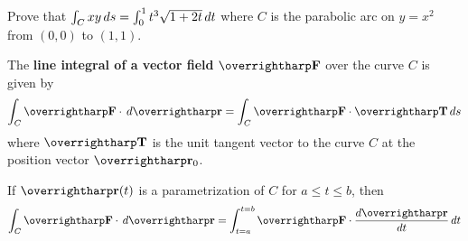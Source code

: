\documentclass[letterpaper, twoside, 12pt]{book}
\begin{document}
          \begin{solution}

          \end{solution}

          \begin{contributors}

          \end{contributors}

          \begin{problem}
            Prove that $\int_C xy\,d{s}=\int_0^1 t^3\sqrt{1+2t}\,d{t}$
            where $C$ is the parabolic arc
            on $y=x^2$ from $(0,0)$ to $(1,1)$.
          \end{problem}

          \begin{solution}

          \end{solution}

          \begin{contributors}

          \end{contributors}

\begin{definition}
The \textbf{line integral of a vector field} $\vect F$ over the curve $C$
is given by
    \[
      \int_C \vect{F}\cdot\dvar{\vect r}
        =
      \int_C \vect{F}\cdot\vect{T}\dvar{s}
    \]
where $\vect T$ is the unit tangent vector to the curve $C$ at the
position vector $\vect r_0$.
\end{definition}

\begin{definition}
If $\vect{r}(t)$ is a parametrization of $C$ for $a \leq t \leq b$, then
    \[
      \int_C \vect{F}\cdot\dvar{\vect r}
        =
      \int_{t=a}^{t=b} \vect{F}\cdot\frac{d\vect{r}}{dt}\dvar{t}
    \]
\end{definition}





\end{document}

